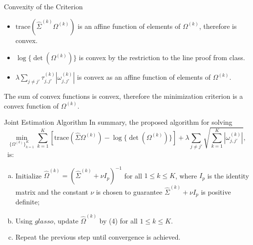 \documentclass[t]{beamer}
\begin{document}
            
             \begin{frame}{Convexity of the Criterion}
              
                \begin{itemize}
\item
                $\mbox{trace}(\hat{\Sigma}^{(k)}  \Omega^{(k)})$ is an affine function of elements of $\Omega^{(k)}$, therefore is convex.
                
                \pause
                \item
                $\log\{ \det(\Omega^{(k)})\}$ is convex by the restriction to the line proof from class.
                
                \pause
                \item
                $\lambda \sum_{j \neq j'} \tau_{j,j'}^{(k)} |\omega_{j,j'}^{(k)}|$ is convex as an affine function of elements of $\Omega^{(k)}$.
               \end{itemize}
               \bigskip

                The sum of convex functions is convex, therefore the minimization criterion is a convex function of $\Omega^{(k)}$.
                
               \end{frame}
               
               \begin{frame}{Joint Estimation Algorithm}  
                   In summary, the proposed algorithm for solving            
\begin{equation*}
              \underset{ \{ \Omega^{(k)}\}_{k=1}^{K}}{\min}   \sum_{k=1}^{K} [\mbox{trace}(\hat{\Sigma} \Omega^{(k)}) - \log\{ \det(\Omega^{(k)})\}] + \lambda \underset{j \neq j'}{\sum} \sqrt{\sum_{k=1}^K |\omega_{j,j'}^{(k)}|},
              \end{equation*}
              \ is:
                   \pause
                   \
                  \begin{enumerate}[(a)]
\item
                 Initialize $\hat{\Omega}^{(k)}=(\hat{\Sigma}^{(k)} + \nu I_p)^{-1}$ for all $1 \leq k \leq K$, where $I_p$ is the identity matrix and the constant $\nu$ is chosen to guarantee $\hat{\Sigma}^{(k)} + \nu I_p$ is positive definite;
                  
                  \item
                        Using $glasso$, update $\hat{\Omega}^{(k)}$ by (4) for all $1 \leq k \leq K$.
                  
                  \item
                  
                  Repeat the previous step until convergence is achieved.
                 \end{enumerate}
                
                \end{frame}
                
\end{document}
